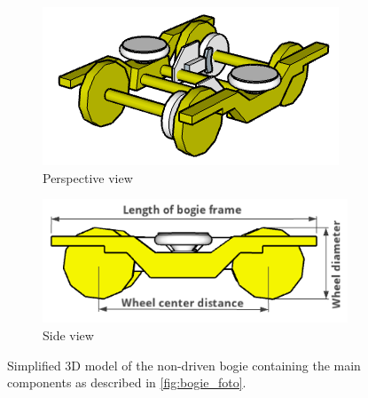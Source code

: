 \begin{figure}[H]
	\centering
	\begin{subfigure}[b]{0.48\textwidth}
		\centering
		\includegraphics{fig/running_bogie_sketchup.PNG}
		\caption{Perspective view}
	\end{subfigure}
	\begin{subfigure}[b]{0.48\textwidth}
		\centering
		\includegraphics[width=\linewidth]{fig/running_bogie_sideview_with_labels.PNG}
		\caption{Side view}
		\label{fig:bogie_side_view}
	\end{subfigure}
	\label{fig:bogie_3d_model}
	\caption{Simplified 3D model of the non-driven bogie containing the main components as described in \cref{fig:bogie_foto}.}
\end{figure}

